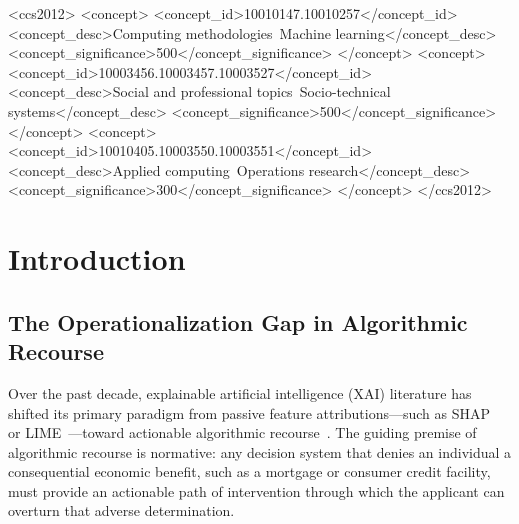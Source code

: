 \documentclass[manuscript,screen,review,anonymous]{acmart}
\begin{document}
\begin{CCSXML}
<ccs2012>
   <concept>
       <concept_id>10010147.10010257</concept_id>
       <concept_desc>Computing methodologies~Machine learning</concept_desc>
       <concept_significance>500</concept_significance>
       </concept>
   <concept>
       <concept_id>10003456.10003457.10003527</concept_id>
       <concept_desc>Social and professional topics~Socio-technical systems</concept_desc>
       <concept_significance>500</concept_significance>
       </concept>
   <concept>
       <concept_id>10010405.10003550.10003551</concept_id>
       <concept_desc>Applied computing~Operations research</concept_desc>
       <concept_significance>300</concept_significance>
       </concept>
 </ccs2012>
\end{CCSXML}



\maketitle

\section{Introduction}

\subsection{The Operationalization Gap in Algorithmic Recourse}
Over the past decade, explainable artificial intelligence (XAI) literature has shifted its primary paradigm from passive feature attributions---such as SHAP~\cite{lundberg2017unified} or LIME~\cite{ribeiro2016why}---toward actionable algorithmic recourse~\cite{wachter2017counterfactual,ustun2019actionable,karimi2021algorithmic}. The guiding premise of algorithmic recourse is normative: any decision system that denies an individual a consequential economic benefit, such as a mortgage or consumer credit facility, must provide an actionable path of intervention through which the applicant can overturn that adverse determination.
\end{document}
